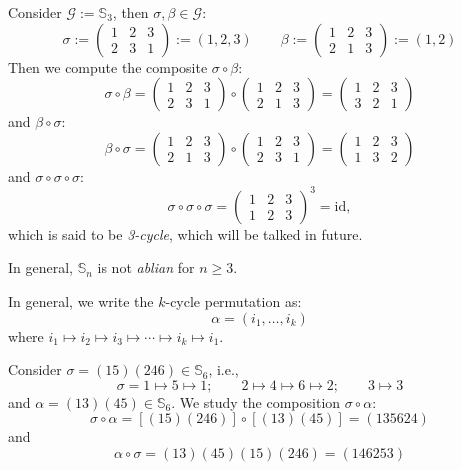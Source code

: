 \begin{example}
Consider $\mathcal{G} := \mathbb{S}_3$, then $\sigma,\beta\in\mathcal{G}$:
\[
\sigma := \begin{pmatrix}
1&2&3\\
2&3&1
\end{pmatrix}:=(1,2,3)
\qquad
\beta := \begin{pmatrix}
1&2&3\\
2&1&3
\end{pmatrix}:=(1,2)
\]
Then we compute the composite $\sigma\circ\beta$:
\[
\sigma\circ\beta=\begin{pmatrix}
1&2&3\\
2&3&1
\end{pmatrix}\circ
\begin{pmatrix}
1&2&3\\
2&1&3
\end{pmatrix}
=
\begin{pmatrix}
1&2&3\\
3&2&1
\end{pmatrix}
\]
and $\beta\circ\sigma$:
\[
\beta\circ\sigma=\begin{pmatrix}
1&2&3\\
2&1&3
\end{pmatrix}
\circ
\begin{pmatrix}
1&2&3\\
2&3&1
\end{pmatrix}
=
\begin{pmatrix}
1&2&3\\
1&3&2
\end{pmatrix}
\]
and $\sigma\circ\sigma\circ\sigma$:
\[
\sigma\circ\sigma\circ\sigma = 
\begin{pmatrix}
1&2&3\\
1&2&3
\end{pmatrix}^3
=\mbox{id},
\]
which is said to be \emph{3-cycle}, which will be talked in future.
\end{example}
\begin{remark}
In general, $\mathbb{S}_n$ is not \emph{ablian} for $n\ge3$.
\end{remark}
In general, we write the $k$-cycle permutation as:
\[
\alpha=(i_1,\dots,i_k)
\]
where $i_1\mapsto i_2\mapsto i_3\mapsto\cdots\mapsto i_k\mapsto i_1$.
\begin{example}
Consider $\sigma = (15)(246)\in\mathbb{S}_6$, i.e.,
\[
\sigma=1\mapsto5\mapsto1;\qquad 2\mapsto4\mapsto6\mapsto2; 
\qquad 3\mapsto3
\]
and $\alpha = (13)(45)\in\mathbb{S}_6$. We study the composition $\sigma\circ\alpha$:
\[
\sigma\circ\alpha=[(15)(246)]\circ[(13)(45)]
=(135624)
\]
and
\[
\alpha\circ\sigma = (13)(45)(15)(246)=(146253)
\]

\end{example}
